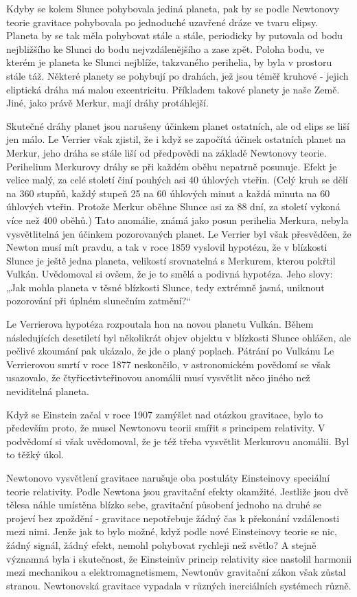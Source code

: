   Kdyby se kolem Slunce pohybovala jediná planeta, pak by se podle Newtonovy teorie gravitace
  pohybovala po jednoduché uzavřené dráze ve tvaru elipsy. Planeta by se tak měla pohybovat stále a
  stále, periodicky by putovala od bodu nejbližšího ke Slunci do bodu nejvzdálenějšího a zase zpět.
  Poloha bodu, ve kterém je planeta ke Slunci nejblíže, takzvaného perihelia, by byla v prostoru
  stále táž. Některé planety se pohybují po drahách, jež jsou téměř kruhové - jejich eliptická dráha
  má malou excentricitu. Příkladem takové planety je naše Země. Jiné, jako právě Merkur, mají dráhy
  protáhlejší. 
  
  Skutečné dráhy planet jsou narušeny účinkem planet ostatních, ale od elips se liší jen málo. Le
  Verrier však zjistil, že i když se započítá účinek ostatních planet na Merkur, jeho dráha se stále
  liší od předpovědi na základě Newtonovy teorie. Perihelium Merkurovy dráhy se při každém oběhu
  nepatrně posunuje. Efekt je velice malý, za celé století činí pouhých asi 40 úhlových vteřin.
  (Celý kruh se dělí na 360 stupňů, každý stupeň 25 na 60 úhlových minut a každá minuta na 60
  úhlových vteřin. Protože Merkur oběhne Slunce asi za 88 dní, za století vykoná více než 400
  oběhů.) Tato anomálie, známá jako posun perihelia Merkura, nebyla vysvětlitelná jen účinkem
  pozorovaných planet. Le Verrier byl však přesvědčen, že Newton musí mít pravdu, a tak v roce 1859
  vyslovil hypotézu, že v blízkosti Slunce je ještě jedna planeta, velikostí srovnatelná s Merkurem,
  kterou pokřtil Vulkán. Uvědomoval si ovšem, že je to smělá a podivná hypotéza. Jeho slovy: „Jak
  mohla planeta v těsné blízkosti Slunce, tedy extrémně jasná, uniknout pozorování při úplném
  slunečním zatmění?“
  
  Le Verrierova hypotéza rozpoutala hon na novou planetu Vulkán. Během následujících desetiletí byl
  několikrát objev objektu v blízkosti Slunce ohlášen, ale pečlivé zkoumání pak ukázalo, že jde o
  planý poplach. Pátrání po Vulkánu Le Verrierovou smrtí v roce 1877 neskončilo, v astronomickém
  povědomí se však usazovalo, že čtyřicetivteřinovou anomálii musí vysvětlit něco jiného než
  neviditelná planeta. 
  
  Když se Einstein začal v roce 1907 zamýšlet nad otázkou gravitace, bylo to především proto, že
  musel Newtonovu teorii smířit s principem relativity. V podvědomí si však uvědomoval, že je též
  třeba vysvětlit Merkurovu anomálii. Byl to těžký úkol. 
  
  Newtonovo vysvětlení gravitace narušuje oba postuláty Einsteinovy speciální teorie relativity.
  Podle Newtona jsou gravitační efekty okamžité. Jestliže jsou dvě tělesa náhle umístěna blízko
  sebe, gravitační působení jednoho na druhé se projeví bez zpoždění - gravitace nepotřebuje žádný
  čas k překonání vzdálenosti mezi nimi. Jenže jak to bylo možné, když podle nové Einsteinovy teorie
  se nic, žádný signál, žádný efekt, nemohl pohybovat rychleji než světlo? A stejně významná byla i
  skutečnost, že Einsteinův princip relativity sice nastolil harmonii mezi mechanikou a
  elektromagnetismem, Newtonův gravitační zákon však zůstal stranou. Newtonovská gravitace vypadala
  v různých inerciálních systémech různě. 
  
